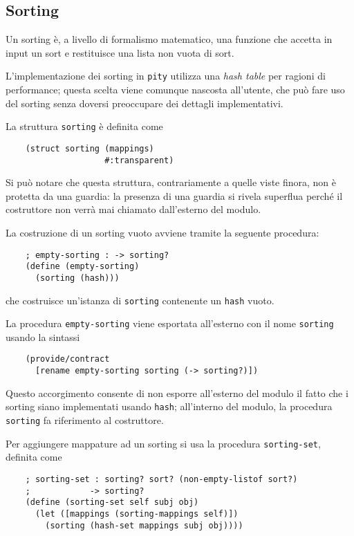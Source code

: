 \subsection{Sorting}

Un sorting \`e, a livello di formalismo matematico, una funzione che
accetta in input un sort e restituisce una lista non vuota di sort.

L'implementazione dei sorting in \lstinline{pity} utilizza una
\emph{hash table} per ragioni di performance; questa scelta viene
comunque nascosta all'utente, che pu\`o fare uso del sorting senza
doversi preoccupare dei dettagli implementativi.

La struttura \lstinline{sorting} \`e definita come

\begin{lstlisting}
    (struct sorting (mappings)
                    #:transparent)
\end{lstlisting}

Si pu\`o notare che questa struttura, contrariamente a quelle viste
finora, non \`e protetta da una guardia: la presenza di una guardia si
rivela superflua perch\'e il costruttore non verr\`a mai chiamato
dall'esterno del modulo.

La costruzione di un sorting vuoto avviene tramite la seguente procedura:

\begin{lstlisting}
    ; empty-sorting : -> sorting?
    (define (empty-sorting)
      (sorting (hash)))
\end{lstlisting}

che costruisce un'istanza di \lstinline{sorting} contenente un
\lstinline{hash} vuoto.

La procedura \lstinline{empty-sorting} viene esportata all'esterno con
il nome \lstinline{sorting} usando la sintassi

\begin{lstlisting}
    (provide/contract
      [rename empty-sorting sorting (-> sorting?)])
\end{lstlisting}

Questo accorgimento consente di non esporre all'esterno del modulo il
fatto che i sorting siano implementati usando \lstinline{hash};
all'interno del modulo, la procedura \lstinline{sorting} fa riferimento
al costruttore.

Per aggiungere mappature ad un sorting si usa la procedura
\lstinline{sorting-set}, definita come

\begin{lstlisting}
    ; sorting-set : sorting? sort? (non-empty-listof sort?)
    ;            -> sorting?
    (define (sorting-set self subj obj)
      (let ([mappings (sorting-mappings self)])
        (sorting (hash-set mappings subj obj))))
\end{lstlisting}

